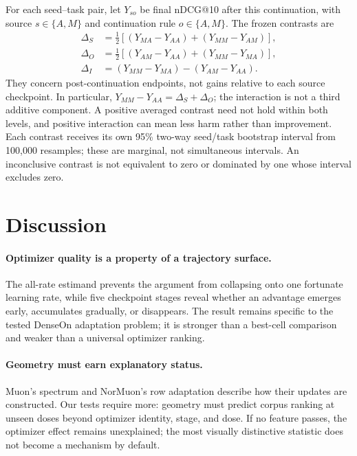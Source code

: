 \documentclass[11pt]{article}
\begin{document}
For each seed--task pair, let $Y_{so}$ be final nDCG@10 after this continuation, with source
$s\in\{A,M\}$ and continuation rule $o\in\{A,M\}$. The frozen contrasts are
\begin{align}
\Delta_S &= \tfrac12[(Y_{MA}-Y_{AA})+(Y_{MM}-Y_{AM})],\\
\Delta_O &= \tfrac12[(Y_{AM}-Y_{AA})+(Y_{MM}-Y_{MA})],\\
\Delta_I &= (Y_{MM}-Y_{MA})-(Y_{AM}-Y_{AA}).
\end{align}
They concern post-continuation endpoints, not gains relative to each source checkpoint. In
particular, $Y_{MM}-Y_{AA}=\Delta_S+\Delta_O$; the interaction is not a third additive component.
A positive averaged contrast need not hold within both levels, and positive interaction can mean
less harm rather than improvement. Each contrast receives its own 95\% two-way seed/task bootstrap
interval from 100,000 resamples; these are marginal, not simultaneous intervals. An inconclusive
contrast is not equivalent to zero or dominated by one whose interval excludes zero.

\StateOperatorMechanismFinding

\section{Discussion}

\paragraph{Optimizer quality is a property of a trajectory surface.}
The all-rate estimand prevents the argument from collapsing onto one fortunate learning rate, while
five checkpoint stages reveal whether an advantage emerges early, accumulates gradually, or
disappears. The result remains specific to the tested DenseOn adaptation problem; it is stronger
than a best-cell comparison and weaker than a universal optimizer ranking.

\paragraph{Geometry must earn explanatory status.}
Muon's spectrum and NorMuon's row adaptation describe how their updates are constructed. Our
tests require more: geometry must predict corpus ranking at unseen doses beyond optimizer identity,
stage, and dose. If no feature passes, the optimizer effect remains unexplained; the most visually
distinctive statistic does not become a mechanism by default.
\end{document}
